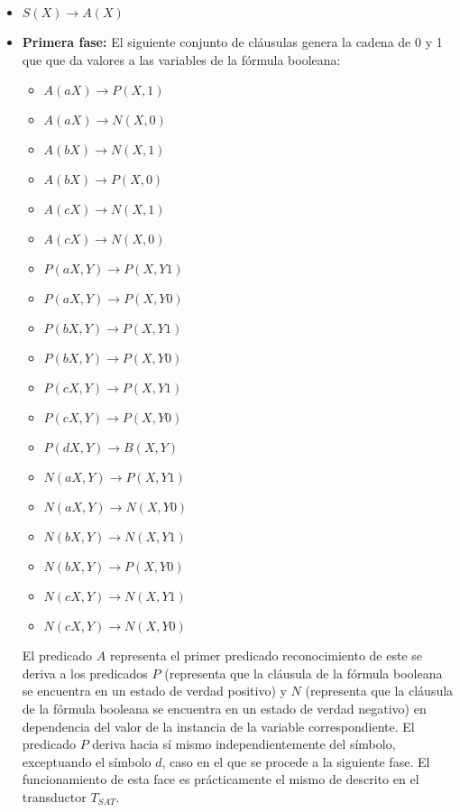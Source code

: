 \documentclass{article}
\begin{document}
\begin{itemize}
    \item $S(X)\to A(X)$
    \item \textbf{Primera fase:} El siguiente conjunto de cláusulas genera la cadena de 0 y 1 que que da valores a las variables de la
          fórmula booleana:
          \begin{multicols}{2}
              \begin{itemize}
                  \item $A(aX)\to P(X,1)$
                  \item $A(aX)\to N(X,0)$
                  \item $A(bX)\to N(X,1)$
                  \item $A(bX)\to P(X,0)$
                  \item $A(cX)\to N(X,1)$
                  \item $A(cX)\to N(X,0)$
                        
                  \item $P(aX,Y)\to P(X,Y1)$
                  \item $P(aX,Y)\to P(X,Y0)$
                  \item $P(bX,Y)\to P(X,Y1)$
                  \item $P(bX,Y)\to P(X,Y0)$
                  \item $P(cX,Y)\to P(X,Y1)$
                  \item $P(cX,Y)\to P(X,Y0)$
                  \item $P(dX,Y)\to B(X,Y)$
                        
                  \item $N(aX,Y)\to P(X,Y1)$
                  \item $N(aX,Y)\to N(X,Y0)$
                  \item $N(bX,Y)\to N(X,Y1)$
                  \item $N(bX,Y)\to P(X,Y0)$
                  \item $N(cX,Y)\to N(X,Y1)$
                  \item $N(cX,Y)\to N(X,Y0)$
              \end{itemize}
          \end{multicols}
          
          El predicado $A$ representa el primer predicado reconocimiento de este se deriva a los predicados $P$
          (representa que la cláusula de la fórmula booleana se encuentra en un estado de verdad positivo) 
          y $N$ (representa que la cláusula de la fórmula booleana se encuentra en un estado de verdad negativo)
          en dependencia del valor de la instancia de la variable correspondiente. El predicado $P$ deriva hacia
          sí mismo independientemente del símbolo, exceptuando el símbolo $d$, caso en el que se procede a la siguiente
          fase.
          El funcionamiento de esta face es prácticamente el mismo de descrito en el transductor $T_{SAT}$.
          

\end{itemize}
\end{document}
